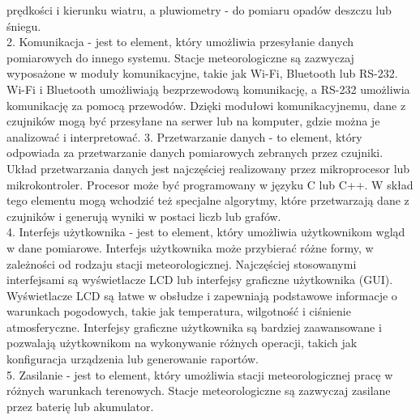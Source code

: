\documentclass{article}
\begin{document}
\begin{center}
\begin{flushleft}
        prędkości i kierunku wiatru, a pluwiometry - do pomiaru opadów deszczu lub śniegu.
        \\[0.5cm]
        2. Komunikacja - jest to element, który umożliwia przesyłanie danych pomiarowych do innego systemu. Stacje meteorologiczne są zazwyczaj wyposażone w moduły komunikacyjne, takie jak Wi-Fi, Bluetooth lub RS-232. Wi-Fi i Bluetooth umożliwiają bezprzewodową komunikację, a RS-232 umożliwia komunikację za pomocą przewodów. Dzięki modułowi komunikacyjnemu, dane z czujników mogą być przesyłane na serwer lub na komputer, gdzie można je analizować i interpretować.
        3. Przetwarzanie danych - to element, który odpowiada za przetwarzanie danych pomiarowych zebranych przez czujniki. Układ przetwarzania danych jest najczęściej realizowany przez mikroprocesor lub mikrokontroler. Procesor może być programowany w języku C lub C++. W skład tego elementu mogą wchodzić też specjalne algorytmy, które przetwarzają dane z czujników i generują wyniki w postaci liczb lub grafów.
        \\[0.5cm]
        4. Interfejs użytkownika - jest to element, który umożliwia użytkownikom wgląd w dane pomiarowe. Interfejs użytkownika może przybierać różne formy, w zależności od rodzaju stacji meteorologicznej. Najczęściej stosowanymi interfejsami są wyświetlacze LCD lub interfejsy graficzne użytkownika (GUI). Wyświetlacze LCD są łatwe w obsłudze i zapewniają podstawowe informacje o warunkach pogodowych, takie jak temperatura, wilgotność i ciśnienie atmosferyczne. Interfejsy graficzne użytkownika są bardziej zaawansowane i pozwalają użytkownikom na wykonywanie różnych operacji, takich jak konfiguracja urządzenia lub generowanie raportów.
        \\[0.5cm]
        5. Zasilanie - jest to element, który umożliwia stacji meteorologicznej pracę w różnych warunkach terenowych. Stacje meteorologiczne są zazwyczaj zasilane przez baterię lub akumulator.
    \end{flushleft}
    
    \newpage


\end{center}
\end{document}
